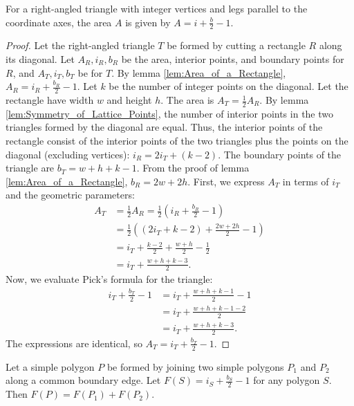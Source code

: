 \begin{lemma}
    \label{lem:Area_of_a_Right_Angled_Triangle}
    For a right-angled triangle with integer vertices and legs parallel to the coordinate axes, the area $A$ is given by $A = i + \frac{b}{2} - 1$.
\end{lemma}

\begin{proof}
    Let the right-angled triangle $T$ be formed by cutting a rectangle $R$ along its diagonal. Let $A_R, i_R, b_R$ be the area, interior points, and boundary points for $R$, and $A_T, i_T, b_T$ be for $T$.
    By lemma \ref{lem:Area_of_a_Rectangle}, $A_R = i_R + \frac{b_R}{2} - 1$.
    Let $k$ be the number of integer points on the diagonal. Let the rectangle have width $w$ and height $h$. The area is $A_T = \frac{1}{2} A_R$.
    By lemma \ref{lem:Symmetry_of_Lattice_Points}, the number of interior points in the two triangles formed by the diagonal are equal. Thus, the interior points of the rectangle consist of the interior points of the two triangles plus the points on the diagonal (excluding vertices): $i_R = 2i_T + (k-2)$.
    The boundary points of the triangle are $b_T = w+h+k-1$. From the proof of lemma \ref{lem:Area_of_a_Rectangle}, $b_R=2w+2h$.
    First, we express $A_T$ in terms of $i_T$ and the geometric parameters:
    \begin{align*}
        A_T &= \frac{1}{2}A_R = \frac{1}{2} \left(i_R + \frac{b_R}{2} - 1\right) \\
            &= \frac{1}{2} \left( (2i_T + k - 2) + \frac{2w+2h}{2} - 1 \right) \\
            &= i_T + \frac{k-2}{2} + \frac{w+h}{2} - \frac{1}{2} \\
            &= i_T + \frac{w+h+k-3}{2}.
    \end{align*}
    Now, we evaluate Pick's formula for the triangle:
    \begin{align*}
        i_T + \frac{b_T}{2} - 1 &= i_T + \frac{w+h+k-1}{2} - 1 \\
                               &= i_T + \frac{w+h+k-1-2}{2} \\
                               &= i_T + \frac{w+h+k-3}{2}.
    \end{align*}
    The expressions are identical, so $A_T = i_T + \frac{b_T}{2} - 1$.
\end{proof}

\begin{lemma}
    \label{lem:Additivity_of_Picks_Formula}
    Let a simple polygon $P$ be formed by joining two simple polygons $P_1$ and $P_2$ along a common boundary edge. Let $F(S) = i_S + \frac{b_S}{2} - 1$ for any polygon $S$. Then $F(P) = F(P_1) + F(P_2)$.
\end{lemma}

